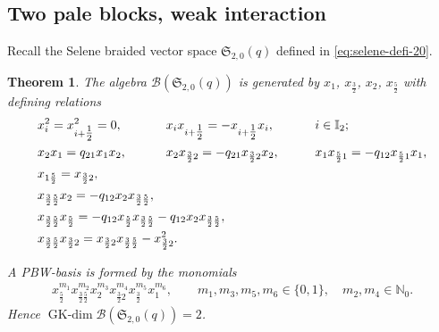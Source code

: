 \documentclass[pdftex]{sigma}
\numberwithin{equation}{section}
\newtheorem{Theorem}{Theorem}[section]
\newcommand{\GK}{\operatorname{GK-dim}}
\newcommand{\toba}{\mathscr B}
\newcommand{\sele}{\mathfrak{S}}
\newcommand{\I}{{\mathbb I}}
\newcommand{\N}{{\mathbb N}}
\newcommand{\tresdos}{\frac{3}{2}}
\newcommand{\cincodos}{\frac{5}{2}}
\begin{document}
\subsection{Two pale blocks, weak interaction} Recall the Selene braided vector space $\sele_{2,0}(q)$ defined in \eqref{eq:selene-defi-20}.

\begin{Theorem} \label{th:selene-2-0}
The algebra $\toba(\sele_{2,0}(q))$ is generated by $x_1$, $x_{\tresdos}$, $x_2$, $x_\cincodos$ with defining relations
\begin{alignat}{3}
\label{eq:endymion-III-1}
& x_i^2 = x_{i+\tfrac{1}{2}}^2=0, \qquad&&\hspace{-20mm}
x_ix_{i+\tfrac{1}{2}} =-x_{i+\tfrac{1}{2}} x_i, \qquad &&i\in\I_2;
\\ \label{eq:endymion-III-2}
&x_2 x_1=q_{21}x_1 x_2, \qquad&&\hspace{-20mm}
x_2 x_{\tresdos2} = -q_{21} x_{\tresdos2}x_2, \qquad
&&x_1 x_{\cincodos1} = -q_{12} x_{\cincodos1}x_1,
\\ \label{eq:two-pale-def-rel-1}
&x_{1\cincodos} = x_{\tresdos2},
\\
\label{relations-two-pale-blocks-4}
&x_{\tresdos\cincodos}x_{2} = -q_{12} x_{2}x_{\tresdos\cincodos},
\\ \label{relations-two-pale-blocks-5}
& x_{\tresdos\cincodos}x_{\cincodos} = -q_{12} x_{\cincodos}x_{\tresdos\cincodos} - q_{12}x_{2}x_{\tresdos\cincodos},
\\ \label{relations-two-pale-blocks-6}
& x_{\tresdos\cincodos}x_{\tresdos2} = x_{\tresdos2}x_{\tresdos\cincodos} - x_{\tresdos2}^2.
\end{alignat}

A PBW-basis is formed by the monomials
\begin{align}\label{eq:two-pale-PBW-basis}
x_{\cincodos}^{m_1}x_{\tresdos\cincodos}^{m_2}x_{2}^{m_3}x_{\tresdos2}^{m_4} x_{\tresdos}^{m_5} x_1^{m_6},\qquad
 m_1, m_3, m_5, m_6 \in \{0,1\}, \quad m_2, m_4 \in \N_0.
\end{align}
Hence $\GK \toba(\sele_{2,0}(q)) = 2$.
\end{Theorem}
\end{document}
